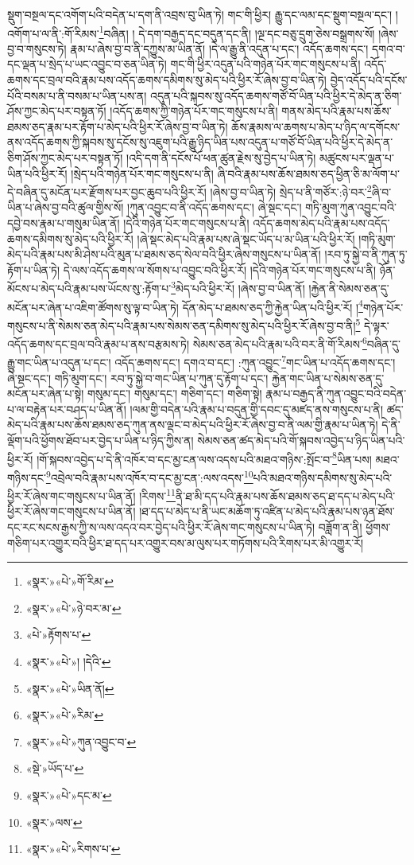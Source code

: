 སྡུག་བསྔལ་དང་འགོག་པའི་བདེན་པ་དག་ནི་འབྲས་བུ་ཡིན་ཏེ། གང་གི་ཕྱིར། རྒྱུ་དང་ལམ་དང་སྡུག་བསྔལ་དང་། །འགོག་པ་ལ་ནི་:གོ་རིམས་\footnote{«སྣར་»«པེ་»གོ་རིམ་}བཞིན། །
དེ་དག་བརྒྱད་དང་བདུན་དང་ནི། །ལྔ་དང་བཅུ་དྲུག་ཅེས་བསྒྲགས་སོ། །ཞེས་བྱ་བ་གསུངས་ཏེ། རྣམ་པ་ཞེས་བྱ་བ་ནི་དཀྱུས་མ་ཡིན་ནོ། །དེ་ལ་རྒྱུ་ནི་འདུན་པ་དང་། འདོད་ཆགས་དང་། དགའ་བ་དང་ལྡན་པ་སྲེད་པ་ཡང་འབྱུང་བ་ཅན་ཡིན་ཏེ། གང་གི་ཕྱིར་འདུན་པའི་གཉེན་པོར་གང་གསུངས་པ་ནི། འདོད་ཆགས་དང་བྲལ་བའི་རྣམ་པས་འདོད་ཆགས་དམིགས་སུ་མེད་པའི་ཕྱིར་རོ་ཞེས་བྱ་བ་ཡིན་ཏེ། བྱེད་འདོད་པའི་དངོས་པོའི་བསམ་པ་ནི་བསམ་པ་ཡིན་པས་ན། འདུན་པའི་སྐབས་སུ་འདོད་ཆགས་གཙོ་བོ་ཡིན་པའི་ཕྱིར་དེ་མེད་ན་ཅིག་ཤོས་ཀྱང་མེད་པར་བསྟན་ཏོ། །འདོད་ཆགས་ཀྱི་གཉེན་པོར་གང་གསུངས་པ་ནི། གནས་མེད་པའི་རྣམ་པས་ཆོས་ཐམས་ཅད་རྣམ་པར་རྟོག་པ་མེད་པའི་ཕྱིར་རོ་ཞེས་བྱ་བ་ཡིན་ཏེ། ཆོས་རྣམས་ལ་ཆགས་པ་མེད་པ་ཉིད་ལ་དགོངས་ནས་འདོད་ཆགས་ཀྱི་སྐབས་སུ་དངོས་སུ་འཇུག་པའི་རྒྱུ་ཉིད་ཡིན་པས་འདུན་པ་གཙོ་བོ་ཡིན་པའི་ཕྱིར་དེ་མེད་ན་ཅིག་ཤོས་ཀྱང་མེད་པར་བསྟན་ཏོ། །འདི་དག་ནི་དངོས་པོ་ཕན་ཚུན་རྗེས་སུ་བྱེད་པ་ཡིན་ཏེ། མཚུངས་པར་ལྡན་པ་ཡིན་པའི་ཕྱིར་རོ། །སྲེད་པའི་གཉེན་པོར་གང་གསུངས་པ་ནི། ཞི་བའི་རྣམ་པས་ཆོས་ཐམས་ཅད་ཕྱིན་ཅི་མ་ལོག་པ་དེ་བཞིན་དུ་མངོན་པར་རྫོགས་པར་བྱང་ཆུབ་པའི་ཕྱིར་རོ། །ཞེས་བྱ་བ་ཡིན་ཏེ། སྲེད་པ་ནི་གཙོར་:ཉེ་བར་\footnote{«སྣར་»«པེ་»ཉེ་བར་མ་}ཞི་བ་ཡིན་པ་ཞེས་བྱ་བའི་ཚུལ་གྱིས་སོ། །ཀུན་འབྱུང་བ་ནི་འདོད་ཆགས་དང་། ཞེ་སྡང་དང་། གཏི་མུག་ཀུན་འབྱུང་བའི་དབྱེ་བས་རྣམ་པ་གསུམ་ཡིན་ནོ། །དེའི་གཉེན་པོར་གང་གསུངས་པ་ནི། འདོད་ཆགས་མེད་པའི་རྣམ་པས་འདོད་ཆགས་དམིགས་སུ་མེད་པའི་ཕྱིར་རོ། །ཞེ་སྡང་མེད་པའི་རྣམ་པས་ཞེ་སྡང་ཡོད་པ་མ་ཡིན་པའི་ཕྱིར་རོ། །གཏི་མུག་མེད་པའི་རྣམ་པས་མི་ཤེས་པའི་མུན་པ་ཐམས་ཅད་སེལ་བའི་ཕྱིར་ཞེས་གསུངས་པ་ཡིན་ནོ། །རབ་ཏུ་སྐྱེ་བ་ནི་ཀུན་ཏུ་རྟོག་པ་ཡིན་ཏེ། དེ་ལས་འདོད་ཆགས་ལ་སོགས་པ་འབྱུང་བའི་ཕྱིར་རོ། །དེའི་གཉེན་པོར་གང་གསུངས་པ་ནི། ཉོན་མོངས་པ་མེད་པའི་རྣམ་པས་ཡོངས་སུ་:རྟོག་པ་\footnote{«པེ་»རྟོགས་པ་}མེད་པའི་ཕྱིར་རོ། །ཞེས་བྱ་བ་ཡིན་ནོ། །རྐྱེན་ནི་སེམས་ཅན་དུ་མངོན་པར་ཞེན་པ་འཇིག་ཚོགས་སུ་ལྟ་བ་ཡིན་ཏེ། དོན་མེད་པ་ཐམས་ཅད་ཀྱི་རྐྱེན་ཡིན་པའི་ཕྱིར་རོ། །\footnote{«སྣར་»«པེ་»། །དེའི་}གཉེན་པོར་གསུངས་པ་ནི་སེམས་ཅན་མེད་པའི་རྣམ་པས་སེམས་ཅན་དམིགས་སུ་མེད་པའི་ཕྱིར་རོ་ཞེས་བྱ་བ་ནི།\footnote{«སྣར་»«པེ་»ཡིན་ནོ།} དེ་ལྟར་འདོད་ཆགས་དང་བྲལ་བའི་རྣམ་པ་ནས་བརྩམས་ཏེ། སེམས་ཅན་མེད་པའི་རྣམ་པའི་བར་ནི་གོ་རིམས་\footnote{«སྣར་»«པེ་»རིམ་}བཞིན་དུ་རྒྱུ་གང་ཡིན་པ་འདུན་པ་དང་། འདོད་ཆགས་དང་། དགའ་བ་དང་། :ཀུན་འབྱུང་\footnote{«སྣར་»«པེ་»ཀུན་འབྱུང་བ་}གང་ཡིན་པ་འདོད་ཆགས་དང་། ཞེ་སྡང་དང་། གཏི་མུག་དང་། རབ་ཏུ་སྐྱེ་བ་གང་ཡིན་པ་ཀུན་དུ་རྟོག་པ་དང་། རྐྱེན་གང་ཡིན་པ་སེམས་ཅན་དུ་མངོན་པར་ཞེན་པ་སྟེ། གསུམ་དང་། གསུམ་དང་། གཅིག་དང་། གཅིག་སྟེ། རྣམ་པ་བརྒྱད་ནི་ཀུན་འབྱུང་བའི་བདེན་པ་ལ་བརྟེན་པར་བཤད་པ་ཡིན་ནོ། །ལམ་གྱི་བདེན་པའི་རྣམ་པ་བདུན་གྱི་དབང་དུ་མཛད་ནས་གསུངས་པ་ནི། ཚད་མེད་པའི་རྣམ་པས་ཆོས་ཐམས་ཅད་ཀུན་ནས་ལྡང་བ་མེད་པའི་ཕྱིར་རོ་ཞེས་བྱ་བ་ནི་ལམ་གྱི་རྣམ་པ་ཡིན་ཏེ། དེ་ནི་ལྡོག་པའི་ཕྱོགས་ཐོབ་པར་བྱེད་པ་ཡིན་པ་ཉིད་ཀྱིས་ན། སེམས་ཅན་ཚད་མེད་པའི་གོ་སྐབས་འབྱེད་པ་ཉིད་ཡིན་པའི་ཕྱིར་རོ། །གོ་སྐབས་འབྱེད་པ་དེ་ནི་འཁོར་བ་དང་མྱ་ངན་ལས་འདས་པའི་མཐའ་གཉིས་:སྤོང་བ་\footnote{«སྡེ་»ཡོད་པ་}ཡིན་པས། མཐའ་གཉིས་དང་\footnote{«སྣར་»«པེ་»དང་མ་}འབྲེལ་བའི་རྣམ་པས་འཁོར་བ་དང་མྱ་ངན་:ལས་འདས་\footnote{«སྣར་»ལས་}པའི་མཐའ་གཉིས་དམིགས་སུ་མེད་པའི་ཕྱིར་རོ་ཞེས་གང་གསུངས་པ་ཡིན་ནོ། །རིགས་\footnote{«སྣར་»«པེ་»རིགས་པ་}ནི་ཐ་མི་དད་པའི་རྣམ་པས་ཆོས་ཐམས་ཅད་ཐ་དད་པ་མེད་པའི་ཕྱིར་རོ་ཞེས་གང་གསུངས་པ་ཡིན་ནོ། །ཐ་དད་པ་མེད་པ་ནི་ཡང་མཆོག་ཏུ་འཛིན་པ་མེད་པའི་རྣམ་པས་ཉན་ཐོས་དང་རང་སངས་རྒྱས་ཀྱི་ས་ལས་འདའ་བར་བྱེད་པའི་ཕྱིར་རོ་ཞེས་གང་གསུངས་པ་ཡིན་ཏེ། བཟློག་ན་ནི། ཕྱོགས་གཅིག་པར་འགྱུར་བའི་ཕྱིར་ཐ་དད་པར་འགྱུར་བས་མ་ལུས་པར་གཏོགས་པའི་རིགས་པར་མི་འགྱུར་རོ། 